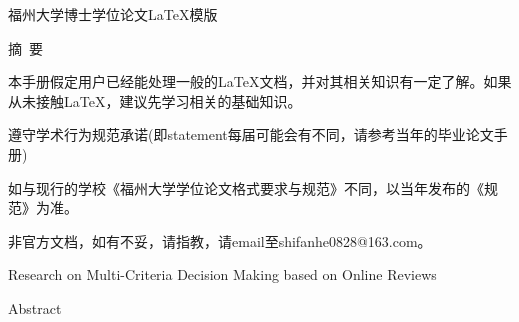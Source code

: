 \pagestyle{plain}{%
\fancyhf{} %
\fancyfoot[C]{\thepage}%
\renewcommand{\headrulewidth}{0pt}
\renewcommand{\footrulewidth}{0pt}}

\vspace{17pt}
\begin{center} 
	{\heitib \xiaoerhao
	\setlength{\baselineskip}{20pt} 
	福州大学博士学位论文\LaTeX 模版}
\vspace{30pt}
\end{center}

\begin{center}
{}  
{\heitib \sihao 摘~要}
\vspace{12pt}
\end{center}

\songti \xiaosihao
\setlength{\baselineskip}{20pt} 

本手册假定用户已经能处理一般的\LaTeX 文档，并对其相关知识有一定了解。如果从未接触\LaTeX，建议先学习相关的基础知识。

遵守学术行为规范承诺(即statement每届可能会有不同，请参考当年的毕业论文手册)

如与现行的学校《福州大学学位论文格式要求与规范》不同，以当年发布的《规范》为准。

非官方文档，如有不妥，请指教，请email至shifanhe0828@163.com。


\newpage
\begin{center} 
\vspace{17pt}
{\setmainfont{Arial Black} \xiaosanhao Research on Multi-Criteria Decision Making based on Online Reviews}
\vspace{30pt}
\end{center}

\begin{center}
{}
{\setmainfont{Arial Black} \sihao Abstract} 
\vspace{12pt}
\end{center}


